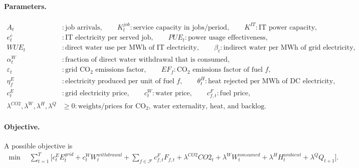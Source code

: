 \documentclass{article}
\begin{document}
\paragraph{Parameters.}
\begin{align*}
    A_t &: \text{job arrivals},\qquad
    K_t^{job}: \text{service capacity in jobs/period},\qquad
    K^{IT}: \text{IT power capacity},\\
    e_t^c &: \text{IT electricity per served job},\qquad
    PUE_t: \text{power usage effectiveness},\\
    WUE_t &: \text{direct water use per MWh of IT electricity},\qquad
    \beta_t: \text{indirect water per MWh of grid electricity},\\
    \alpha_t^W &: \text{fraction of direct water withdrawal that is consumed},\\
    \varepsilon_t &: \text{grid CO$_2$ emissions factor},\qquad
    EF_f: \text{CO$_2$ emissions factor of fuel }f,\\
    \eta_f^E &: \text{electricity produced per unit of fuel }f,\qquad
    \theta_t^H: \text{heat rejected per MWh of DC electricity},\\
    c_t^E &: \text{grid electricity price},\qquad
    c_t^W: \text{water price},\qquad
    c_{f,t}^F: \text{fuel price},\\
    \lambda^{CO2},\lambda^W,\lambda^H,\lambda^Q &\geq 0:
    \text{weights/prices for CO$_2$, water externality, heat, and backlog}.
\end{align*}

\paragraph{Objective.}
A possible objective is
\begin{align*}
\min \quad
    \sum_{t=1}^T \Bigg[
        c_t^E E_t^{grid}
        + c_t^W W_t^{withdrawal}
        + \sum_{f\in\mathcal{F}} c_{f,t}^F F_{f,t}
        + \lambda^{CO2} CO2_t
        + \lambda^W W_t^{consumed}
        + \lambda^H H_t^{ambient}
        + \lambda^Q Q_{t+1}
    \Bigg].
\end{align*}
\end{document}
